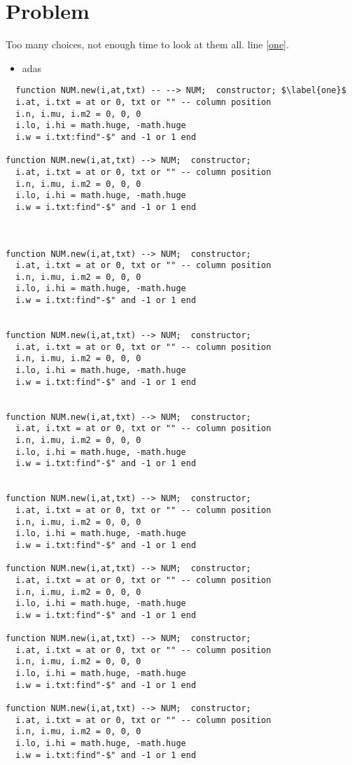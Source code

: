 \documentclass[twocolumn,landscape,9pt]{book}
\begin{document}
\section{Problem}
Too many choices, not enough time to look at them all.
line \ref{one}.
\begin{itemize} 
\item adas
\end{itemize}
\clearpage
\begin{verbatim}
  function NUM.new(i,at,txt) -- --> NUM;  constructor; $\label{one}$
  i.at, i.txt = at or 0, txt or "" -- column position 
  i.n, i.mu, i.m2 = 0, 0, 0
  i.lo, i.hi = math.huge, -math.huge 
  i.w = i.txt:find"-$" and -1 or 1 end

function NUM.new(i,at,txt) --> NUM;  constructor; 
  i.at, i.txt = at or 0, txt or "" -- column position 
  i.n, i.mu, i.m2 = 0, 0, 0
  i.lo, i.hi = math.huge, -math.huge 
  i.w = i.txt:find"-$" and -1 or 1 end



function NUM.new(i,at,txt) --> NUM;  constructor; 
  i.at, i.txt = at or 0, txt or "" -- column position 
  i.n, i.mu, i.m2 = 0, 0, 0
  i.lo, i.hi = math.huge, -math.huge 
  i.w = i.txt:find"-$" and -1 or 1 end


function NUM.new(i,at,txt) --> NUM;  constructor; 
  i.at, i.txt = at or 0, txt or "" -- column position 
  i.n, i.mu, i.m2 = 0, 0, 0
  i.lo, i.hi = math.huge, -math.huge 
  i.w = i.txt:find"-$" and -1 or 1 end


function NUM.new(i,at,txt) --> NUM;  constructor; 
  i.at, i.txt = at or 0, txt or "" -- column position 
  i.n, i.mu, i.m2 = 0, 0, 0
  i.lo, i.hi = math.huge, -math.huge 
  i.w = i.txt:find"-$" and -1 or 1 end


function NUM.new(i,at,txt) --> NUM;  constructor; 
  i.at, i.txt = at or 0, txt or "" -- column position 
  i.n, i.mu, i.m2 = 0, 0, 0
  i.lo, i.hi = math.huge, -math.huge 
  i.w = i.txt:find"-$" and -1 or 1 end

function NUM.new(i,at,txt) --> NUM;  constructor; 
  i.at, i.txt = at or 0, txt or "" -- column position 
  i.n, i.mu, i.m2 = 0, 0, 0
  i.lo, i.hi = math.huge, -math.huge 
  i.w = i.txt:find"-$" and -1 or 1 end

function NUM.new(i,at,txt) --> NUM;  constructor; 
  i.at, i.txt = at or 0, txt or "" -- column position 
  i.n, i.mu, i.m2 = 0, 0, 0
  i.lo, i.hi = math.huge, -math.huge 
  i.w = i.txt:find"-$" and -1 or 1 end

function NUM.new(i,at,txt) --> NUM;  constructor; 
  i.at, i.txt = at or 0, txt or "" -- column position 
  i.n, i.mu, i.m2 = 0, 0, 0
  i.lo, i.hi = math.huge, -math.huge 
  i.w = i.txt:find"-$" and -1 or 1 end


\end{verbatim}
\end{document}
